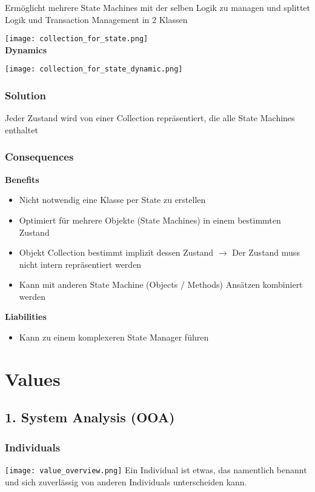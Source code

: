 Ermöglicht mehrere State Machines mit der selben Logik zu managen und splittet Logik und Transaction Management in 2 Klassen

\texttt{[image: collection\_for\_state.png]} \\

\textbf{Dynamics}

\texttt{[image: collection\_for\_state\_dynamic.png]}

\subsubsection{Solution}

Jeder Zustand wird von einer Collection repräsentiert, die alle State Machines enthaltet

\subsubsection{Consequences}
\textbf{Benefits}
\begin{itemize}
    \item Nicht notwendig eine Klasse per State zu erstellen
    \item Optimiert für mehrere Objekte (State Machines) in einem bestimmten Zustand
    \item Objekt Collection bestimmt implizit dessen Zustand $\rightarrow$ Der Zustand muss nicht intern repräsentiert werden
    \item Kann mit anderen State Machine (Objects / Methods) Ansätzen kombiniert werden
\end{itemize}
\vspace{10pt}
\textbf{Liabilities}
\begin{itemize}
    \item Kann zu einem komplexeren State Manager führen
\end{itemize}


\newpage
\section{Values}
\subsection{1. System Analysis (OOA)}
\subsubsection{Individuals}
\texttt{[image: value\_overview.png]}
Ein Individual ist etwas, das namentlich benannt und sich zuverlässig von anderen
Individuals unterscheiden kann. \\

